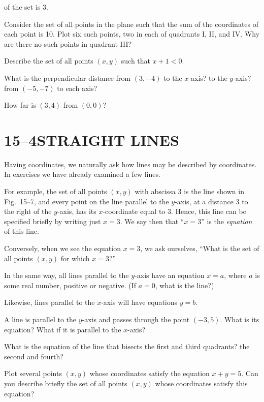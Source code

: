 \documentclass[11pt]{book}
\theoremstyle{bkplain}
\theoremstyle{XIplainnote}
\theoremstyle{bkplain}
\theoremstyle{bkplain}
\begin{document}
\begin{exercisecols}
\begin{exlist}
  of the set is 3.
\item Consider the set of all points in the plane such that the sum of the
  coordinates of each point is 10. Plot six such points, two in each of
  quadrants I, II, and IV. Why are there no such points in quadrant III?
\item Describe the set of all points $(x, y)$ such that $x + 1 < 0$.
\item What is the perpendicular distance from $(3, -4)$ to the $x$-axis? to
  the $y$-axis? from $(-5, -7)$ to each axis?
\item How far is $(3, 4)$ from $(0, 0)$?
\end{exlist}
\end{exercisecols}

\section*{15--4\quad STRAIGHT LINES}

Having coordinates, we naturally ask how lines may be described by
coordinates. In exercises we have already examined a few lines.

For example, the set of all points $(x, y)$ with abscissa 3 is the line shown
in Fig.~15--7, and every point on the line parallel to the $y$-axis, at a
distance 3 to the right of the $y$-axis, has its $x$-coordinate equal to 3.
Hence, this line can be specified briefly by writing just $x = 3$. We say then
that ``$x = 3$'' is the \emph{equation} of this line.

\FIGXVSEVEN

Conversely, when we see the equation $x = 3$, we ask ourselves, ``What is the
set of all points $(x, y)$ for which $x = 3$?''

In the same way, all lines parallel to the $y$-axis have an equation $x = a$,
where $a$ is some real number, positive or negative. (If $a = 0$, what is the
line?)

Likewise, lines parallel to the $x$-axis will have equations $y = b$.

\begin{exercisecols}
\begin{exlist}
\item A line is parallel to the $y$-axis and passes through the point
  $(-3, 5)$. What is its equation? What if it is parallel to the $x$-axis?
\item What is the equation of the line that bisects the first and third
  quadrants? the second and fourth?
\item[\stex 3.] Plot several points $(x, y)$ whose coordinates satisfy the
  equation $x + y = 5$. Can you describe briefly the set of all points
  $(x, y)$ whose coordinates satisfy this equation?
\end{exlist}
\end{exercisecols}
\end{document}
